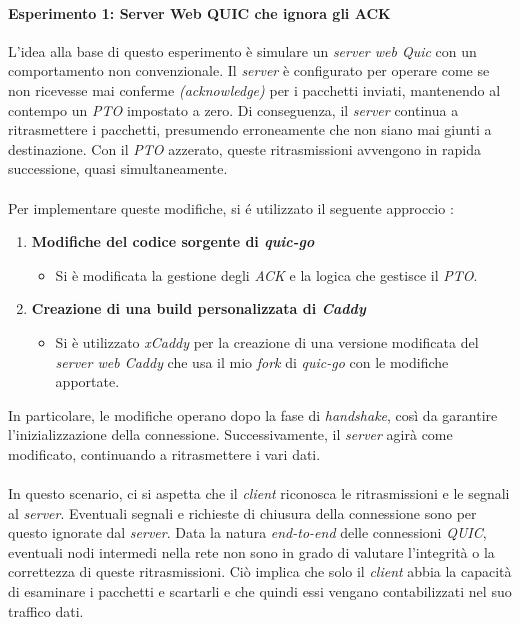 \paragraph{Esperimento 1: Server Web QUIC che ignora gli ACK}
\noindent L'idea alla base di questo esperimento è simulare un \emph{server web Quic} con un comportamento non convenzionale. 
Il \emph{server} è configurato per operare come se non ricevesse mai conferme \emph{(acknowledge)} per i pacchetti inviati, mantenendo al contempo un \emph{PTO} impostato a zero. 
Di conseguenza, il \emph{server} continua a ritrasmettere i pacchetti, presumendo erroneamente che non siano mai giunti a destinazione. Con il \emph{PTO} azzerato, queste ritrasmissioni avvengono in rapida successione, quasi simultaneamente.
\\\\
Per implementare queste modifiche, si é utilizzato il seguente approccio : 
\begin{enumerate}[label=\roman*]
    \item \textbf{Modifiche del codice sorgente di \emph{quic-go}}
    \begin{itemize}
        \item Si è modificata la gestione degli \emph{ACK} e la logica che gestisce il \emph{PTO}.
    \end{itemize}
    \item \textbf{Creazione di una build personalizzata di \emph{Caddy}}
    \begin{itemize}
        \item Si è utilizzato \emph{xCaddy} per la creazione di una versione modificata del \emph{server web Caddy} che usa il mio \emph{fork} di \emph{quic-go} con le modifiche apportate.
    \end{itemize}
\end{enumerate}
In particolare, le modifiche operano dopo la fase di \emph{handshake}, così da garantire l'inizializzazione della connessione. Successivamente, il \emph{server} agirà come modificato, continuando a ritrasmettere i vari dati.
\\\\
In questo scenario, ci si aspetta che il \emph{client} riconosca le ritrasmissioni e le segnali al \emph{server}. Eventuali segnali e richieste di chiusura della connessione sono per questo ignorate dal \emph{server}.
Data la natura \emph{end-to-end} delle connessioni \emph{QUIC}, eventuali nodi intermedi nella rete non sono in grado di valutare l'integrità o la correttezza di queste ritrasmissioni.
Ciò implica che solo il \emph{client} abbia la capacità di esaminare i pacchetti e scartarli e che quindi essi vengano contabilizzati nel suo traffico dati.
